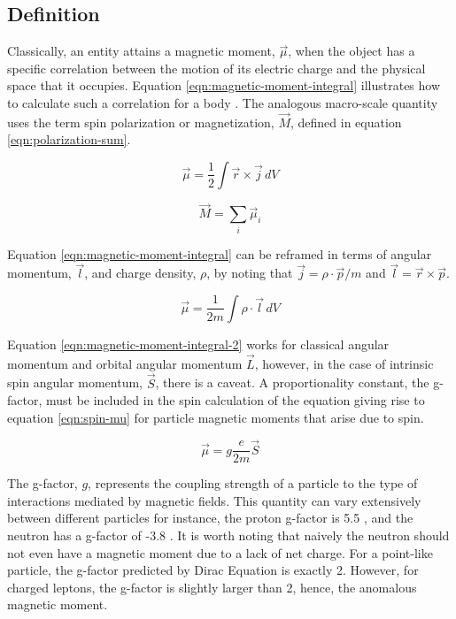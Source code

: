 \subsection{Definition}
Classically, an entity attains a magnetic moment, $\vec{\mu}$, when the object has a specific correlation between the motion of its electric charge and the physical space that it occupies.  Equation \ref{eqn:magnetic-moment-integral} illustrates how to calculate such a correlation for a body \cite{jackson}.  The analogous macro-scale quantity uses the term spin polarization or magnetization, $\vec{M}$, defined in equation \ref{eqn:polarization-sum}.

\begin{equation}
\label{eqn:magnetic-moment-integral}
\vec{\mu} = \frac{1}{2} \int \vec{r} \times \vec{j} \,dV
\end{equation}

\begin{equation}
\label{eqn:polarization-sum}
\vec{M} = \sum_i \vec{\mu}_i
\end{equation}

\noindent
Equation \ref{eqn:magnetic-moment-integral} can be reframed in terms of angular momentum, $\vec{l}$, and charge density, $\rho$, by noting that $\vec{j} = \rho \cdot \vec{p}/m$ and $\vec{l} = \vec{r} \times \vec{p}$.

\begin{equation}
\label{eqn:magnetic-moment-integral-2}
\vec{\mu} = \frac{1}{2 m} \int \rho \cdot \vec{l} \,dV
\end{equation}

Equation \ref{eqn:magnetic-moment-integral-2} works for classical angular momentum and orbital angular momentum $\vec{L}$, however, in the case of intrinsic spin angular momentum, $\vec{S}$, there is a caveat.  A proportionality constant, the g-factor, must be included in the spin calculation of the equation giving rise to equation \ref{eqn:spin-mu} for particle magnetic moments that arise due to spin.

\begin{equation}
\label{eqn:spin-mu}
\vec{\mu} = g \frac{e}{2 m}\vec{S}
\end{equation}

\noindent
The g-factor, $g$, represents the coupling strength of a particle to the type of interactions mediated by magnetic fields.  This quantity can vary extensively between different particles for instance, the proton g-factor is 5.5 \cite{codata}, and the neutron has a g-factor of -3.8 \cite{codata}.  It is worth noting that naively the neutron should not even have a magnetic moment due to a lack of net charge.  For a point-like particle, the g-factor predicted by Dirac Equation is exactly 2.  However, for charged leptons, the g-factor is slightly larger than 2, hence, the anomalous magnetic moment.

